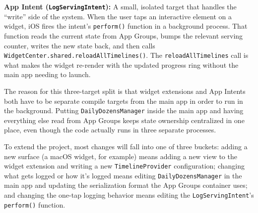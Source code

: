 \documentclass[10pt,twocolumn]{article}
\begin{document}
\noindent\textbf{App Intent (\texttt{LogServingIntent}):} A small, isolated target that handles the ``write'' side of the system. When the user taps an interactive element on a widget, iOS fires the intent's \texttt{perform()} function in a background process. That function reads the current state from App Groups, bumps the relevant serving counter, writes the new state back, and then calls \texttt{WidgetCenter.shared.\linebreak reloadAllTimelines()}. The \texttt{reloadAllTimelines} call is what makes the widget re-render with the updated progress ring without the main app needing to launch.

The reason for this three-target split is that widget extensions and App Intents both have to be separate compile targets from the main app in order to run in the background. Putting \texttt{DailyDozensManager} inside the main app and having everything else read from App Groups keeps state ownership centralized in one place, even though the code actually runs in three separate processes.

To extend the project, most changes will fall into one of three buckets: adding a new surface (a macOS widget, for example) means adding a new view to the widget extension and writing a new \texttt{TimelineProvider} configuration; changing what gets logged or how it's logged means editing \texttt{DailyDozensManager} in the main app and updating the serialization format the App Groups container uses; and changing the one-tap logging behavior means editing the \texttt{LogServingIntent}'s \texttt{perform()} function.

\printbibliography
\end{document}
